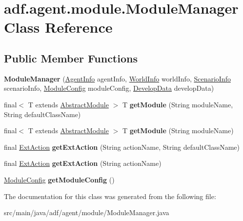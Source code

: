 \hypertarget{classadf_1_1agent_1_1module_1_1ModuleManager}{}\section{adf.\+agent.\+module.\+Module\+Manager Class Reference}
\label{classadf_1_1agent_1_1module_1_1ModuleManager}
\subsection*{Public Member Functions}
\begin{DoxyCompactItemize}
\item 
\hypertarget{classadf_1_1agent_1_1module_1_1ModuleManager_ac16f2c9e14069d9b77054a12e5b58b15}{}\label{classadf_1_1agent_1_1module_1_1ModuleManager_ac16f2c9e14069d9b77054a12e5b58b15} 
{\bfseries Module\+Manager} (\hyperlink{classadf_1_1agent_1_1info_1_1AgentInfo}{Agent\+Info} agent\+Info, \hyperlink{classadf_1_1agent_1_1info_1_1WorldInfo}{World\+Info} world\+Info, \hyperlink{classadf_1_1agent_1_1info_1_1ScenarioInfo}{Scenario\+Info} scenario\+Info, \hyperlink{classadf_1_1agent_1_1config_1_1ModuleConfig}{Module\+Config} module\+Config, \hyperlink{classadf_1_1agent_1_1develop_1_1DevelopData}{Develop\+Data} develop\+Data)
\item 
\hypertarget{classadf_1_1agent_1_1module_1_1ModuleManager_a53d335af22bbe454bd59eab127e5f0d0}{}\label{classadf_1_1agent_1_1module_1_1ModuleManager_a53d335af22bbe454bd59eab127e5f0d0} 
final$<$ T extends \hyperlink{classadf_1_1component_1_1module_1_1AbstractModule}{Abstract\+Module} $>$ T {\bfseries get\+Module} (String module\+Name, String default\+Class\+Name)
\item 
\hypertarget{classadf_1_1agent_1_1module_1_1ModuleManager_a97f961775277112b300c281b55b2571f}{}\label{classadf_1_1agent_1_1module_1_1ModuleManager_a97f961775277112b300c281b55b2571f} 
final$<$ T extends \hyperlink{classadf_1_1component_1_1module_1_1AbstractModule}{Abstract\+Module} $>$ T {\bfseries get\+Module} (String module\+Name)
\item 
\hypertarget{classadf_1_1agent_1_1module_1_1ModuleManager_a728d6363557aeca0b9df294a47eca680}{}\label{classadf_1_1agent_1_1module_1_1ModuleManager_a728d6363557aeca0b9df294a47eca680} 
final \hyperlink{classadf_1_1component_1_1extaction_1_1ExtAction}{Ext\+Action} {\bfseries get\+Ext\+Action} (String action\+Name, String default\+Class\+Name)
\item 
\hypertarget{classadf_1_1agent_1_1module_1_1ModuleManager_a6c4b4d88631190f3d7f2254918d934fa}{}\label{classadf_1_1agent_1_1module_1_1ModuleManager_a6c4b4d88631190f3d7f2254918d934fa} 
final \hyperlink{classadf_1_1component_1_1extaction_1_1ExtAction}{Ext\+Action} {\bfseries get\+Ext\+Action} (String action\+Name)
\item 
\hypertarget{classadf_1_1agent_1_1module_1_1ModuleManager_aea388134b8a03bf6237eb5874da9e095}{}\label{classadf_1_1agent_1_1module_1_1ModuleManager_aea388134b8a03bf6237eb5874da9e095} 
\hyperlink{classadf_1_1agent_1_1config_1_1ModuleConfig}{Module\+Config} {\bfseries get\+Module\+Config} ()
\end{DoxyCompactItemize}


The documentation for this class was generated from the following file\+:\begin{DoxyCompactItemize}
\item 
src/main/java/adf/agent/module/Module\+Manager.\+java\end{DoxyCompactItemize}
